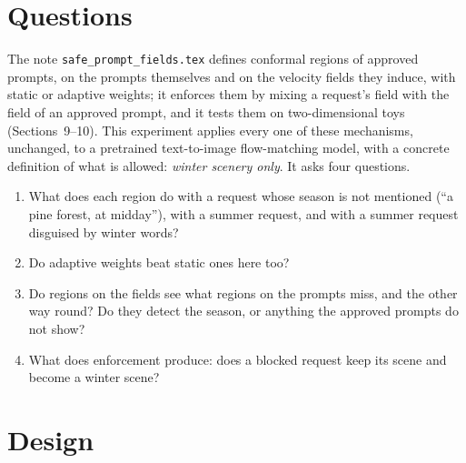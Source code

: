 \documentclass{article}
\begin{document}
\section{Questions}\label{sec:questions}
The note \texttt{safe\_prompt\_fields.tex} defines conformal regions of approved prompts, on the prompts themselves and on the
velocity fields they induce, with static or adaptive weights; it enforces them by mixing a request's field with the field of an
approved prompt, and it tests them on two-dimensional toys (Sections~9--10). This experiment applies every one of these mechanisms,
unchanged, to a pretrained text-to-image flow-matching model, with a concrete definition of what is allowed: \emph{winter scenery
only}. It asks four questions.
\begin{enumerate}[label=(Q\arabic*)]
\item What does each region do with a request whose season is not mentioned (``a pine forest, at midday''), with a summer request, and
with a summer request disguised by winter words?
\item Do adaptive weights beat static ones here too?
\item Do regions on the fields see what regions on the prompts miss, and the other way round? Do they detect the season, or
anything the approved prompts do not show?
\item What does enforcement produce: does a blocked request keep its scene and become a winter scene?
\end{enumerate}

\section{Design}\label{sec:design}
\end{document}
